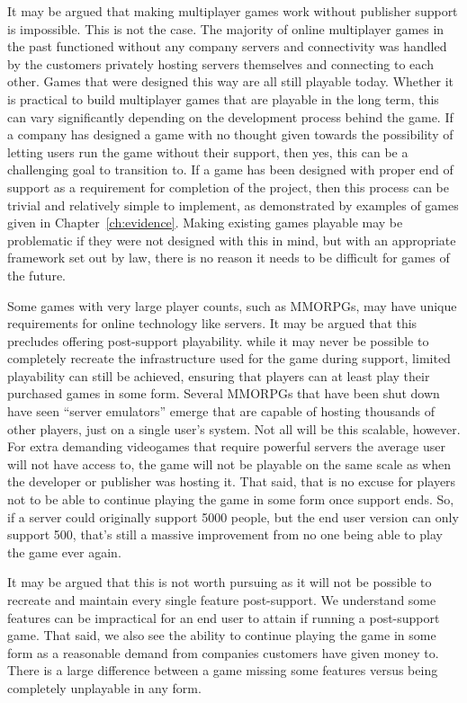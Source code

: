 It may be argued that making multiplayer games work without publisher support is impossible.
This is not the case.
The majority of online multiplayer games in the past functioned without any company servers
and connectivity was handled by the customers privately hosting servers themselves and connecting to each other.
Games that were designed this way are all still playable today.
Whether it is practical to build multiplayer games that are playable in the long term, this can vary significantly depending on the development process behind the game.
If a company has designed a game with no thought given towards the possibility of letting users run the game without their support, then yes,
this can be a challenging goal to transition to.
If a game has been designed with proper end of support as a requirement for completion of the project, then this process can be trivial and relatively simple to implement,
as demonstrated by examples of games given in Chapter~\ref{ch:evidence}.
Making existing games playable may be problematic if they were not designed with this in mind,
but with an appropriate framework set out by law, there is no reason it needs to be difficult for games of the future.

Some games with very large player counts, such as MMORPGs, may have unique requirements for online technology like servers.
It may be argued that this precludes offering post-support playability.
while it may never be possible to completely recreate the infrastructure used for the game during support,
limited playability can still be achieved, ensuring that players can at least play their purchased games in some form.
Several MMORPGs that have been shut down have seen ``server emulators'' emerge that are capable of hosting thousands of other players, just on a single user's system\cn.
Not all will be this scalable, however.
For extra demanding videogames that require powerful servers the average user will not have access to,
the game will not be playable on the same scale as when the developer or publisher was hosting it.
That said, that is no excuse for players not to be able to continue playing the game in some form once support ends.
So, if a server could originally support 5000 people, but the end user version can only support 500,
that's still a massive improvement from no one being able to play the game ever again.

It may be argued that this is not worth pursuing as it will not be possible to recreate and maintain every single feature post-support.
We understand some features can be impractical for an end user to attain if running a post-support game.%
That said, we also see the ability to continue playing the game in some form as a reasonable demand from companies customers have given money to.
There is a large difference between a game missing some features versus being completely unplayable in any form.

